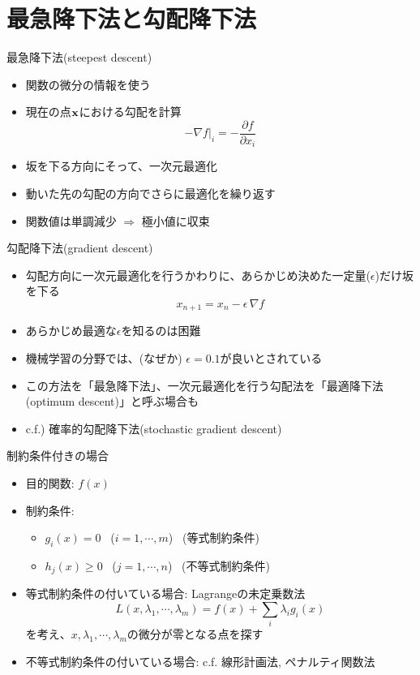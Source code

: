 \section{最急降下法と勾配降下法}

\begin{frame}[t,fragile]{最急降下法(steepest descent)}
  \begin{itemize}
    \setlength{\itemsep}{1em}
  \item 関数の微分の情報を使う
  \item 現在の点$\bf x$における勾配を計算
    \[
    -\nabla f|_i = -\frac{\partial f}{\partial x_i}
    \]
  \item 坂を下る方向にそって、一次元最適化
  \item 動いた先の勾配の方向でさらに最適化を繰り返す
  \item 関数値は単調減少 $\Rightarrow$ 極小値に収束
  \end{itemize}
\end{frame}

\begin{frame}[t,fragile]{勾配降下法(gradient descent)}
  \begin{itemize}
    \setlength{\itemsep}{1em}
  \item 勾配方向に一次元最適化を行うかわりに、あらかじめ決めた一定量($\epsilon$)だけ坂を下る
    \[
    x_{n+1} = x_n - \epsilon \, \nabla f
    \]
  \item あらかじめ最適な$\epsilon$を知るのは困難
  \item 機械学習の分野では、(なぜか) $\epsilon=0.1$が良いとされている
  \item この方法を「最急降下法」、一次元最適化を行う勾配法を「最適降下法(optimum descent)」と呼ぶ場合も
  \item c.f.) 確率的勾配降下法(stochastic gradient descent)
  \end{itemize}
\end{frame}

\begin{frame}[t,fragile]{制約条件付きの場合}
  \begin{itemize}
  \item 目的関数: $f(x)$
  \item 制約条件:
    \begin{itemize}
    \item $g_i(x) = 0$ \ ($i=1,\cdots,m$) \ (等式制約条件)
    \item $h_j(x) \ge 0$ \ ($j=1,\cdots,n$) \ (不等式制約条件)
    \end{itemize}
  \item 等式制約条件の付いている場合: Lagrangeの未定乗数法
    \[
    L(x,\lambda_1,\cdots,\lambda_m)=f(x)+\sum_i \lambda_i g_i(x)
    \]
    を考え、$x,\lambda_1,\cdots,\lambda_m$の微分が零となる点を探す
  \item 不等式制約条件の付いている場合: c.f. 線形計画法, ペナルティ関数法
  \end{itemize}
\end{frame}

